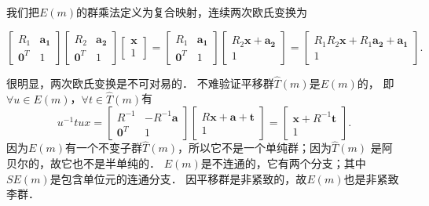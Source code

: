 我们把$E(m)$的群乘法定义为复合映射，连续两次欧氏变换为
\begin{small}
\begin{equation}\label{chlg:eqn_Emtimes}
    \begin{bmatrix}  R_1 & \boldsymbol{a_1} \\ \boldsymbol{0}^T & 1  \end{bmatrix}
    \begin{bmatrix}  R_2 & \boldsymbol{a_2} \\ \boldsymbol{0}^T & 1  \end{bmatrix}
    \begin{bmatrix}  \boldsymbol{x} \\ 1 \end{bmatrix} 
    =\begin{bmatrix}  R_1 & \boldsymbol{a_1} \\ \boldsymbol{0}^T & 1  \end{bmatrix}
    \begin{bmatrix}  R_2\boldsymbol{x} + \boldsymbol{a_2} \\  1  \end{bmatrix}
    =\begin{bmatrix}  R_1 R_2\boldsymbol{x} + R_1 \boldsymbol{a_2} +\boldsymbol{a_1} \\  1  \end{bmatrix}.
\end{equation}
\end{small}
很明显，两次欧氏变换是不可对易的．
不难验证平移群$\hat{T}(m)$是$E(m)$的，
即$\forall u \in E(m)$，$\forall t \in \hat{T}(m)$有
\begin{equation}
    u^{-1} t u x= 
    \begin{bmatrix}  R^{-1} & -R^{-1} \boldsymbol{a} \\ \boldsymbol{0}^T & 1    \end{bmatrix}
    \begin{bmatrix}  R\boldsymbol{x} + \boldsymbol{a} +  \boldsymbol{t}\\  1  \end{bmatrix}
    =\begin{bmatrix} \boldsymbol{x} + R^{-1} \boldsymbol{t}\\  1  \end{bmatrix}.
\end{equation}
因为$E(m)$有一个不变子群$\hat{T}(m)$，所以它不是一个单纯群；因为$\hat{T}(m)$
是阿贝尔的，故它也不是半单纯的．
$E(m)$是不连通的，它有两个分支；其中$SE(m)$是包含单位元的连通分支．
因平移群是非紧致的，故$E(m)$也是非紧致李群．

